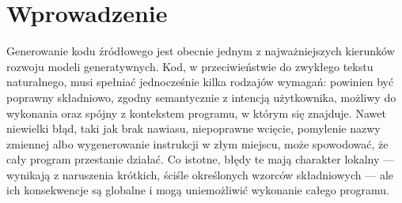 \section{Wprowadzenie}
\label{sec:wprowadzenie}

Generowanie kodu źródłowego jest obecnie jednym z najważniejszych kierunków rozwoju modeli generatywnych. Kod, w przeciwieństwie do zwykłego tekstu naturalnego, musi spełniać jednocześnie kilka rodzajów wymagań: powinien być poprawny składniowo, zgodny semantycznie z intencją użytkownika, możliwy do wykonania oraz spójny z kontekstem programu, w którym się znajduje. Nawet niewielki błąd, taki jak brak nawiasu, niepoprawne wcięcie, pomylenie nazwy zmiennej albo wygenerowanie instrukcji w złym miejscu, może spowodować, że cały program przestanie działać. Co istotne, błędy te mają charakter lokalny — wynikają z naruszenia krótkich, ściśle określonych wzorców składniowych — ale ich konsekwencje są globalne i mogą uniemożliwić wykonanie całego programu.
